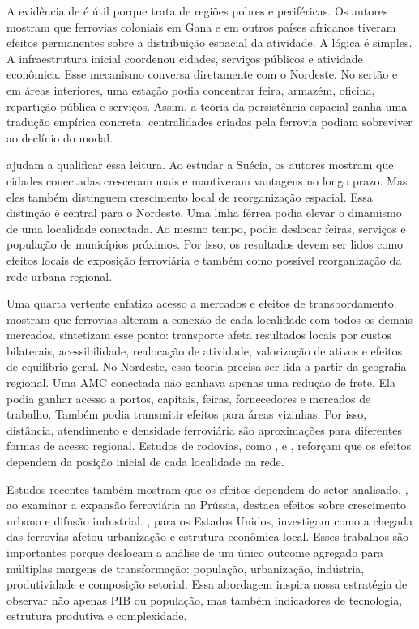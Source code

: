 \documentclass[12pt,a4paper]{article}
\begin{document}
A evidência de \citet{jedwab2016} é útil porque trata de regiões pobres e periféricas. Os autores mostram que ferrovias coloniais em Gana e em outros países africanos tiveram efeitos permanentes sobre a distribuição espacial da atividade. A lógica é simples. A infraestrutura inicial coordenou cidades, serviços públicos e atividade econômica. Esse mecanismo conversa diretamente com o Nordeste. No sertão e em áreas interiores, uma estação podia concentrar feira, armazém, oficina, repartição pública e serviços. Assim, a teoria da persistência espacial ganha uma tradução empírica concreta: centralidades criadas pela ferrovia podiam sobreviver ao declínio do modal.

\citet{berger2017} ajudam a qualificar essa leitura. Ao estudar a Suécia, os autores mostram que cidades conectadas cresceram mais e mantiveram vantagens no longo prazo. Mas eles também distinguem crescimento local de reorganização espacial. Essa distinção é central para o Nordeste. Uma linha férrea podia elevar o dinamismo de uma localidade conectada. Ao mesmo tempo, podia deslocar feiras, serviços e população de municípios próximos. Por isso, os resultados devem ser lidos como efeitos locais de exposição ferroviária e também como possível reorganização da rede urbana regional.

Uma quarta vertente enfatiza acesso a mercados e efeitos de transbordamento. \citet{donaldsonhornbeck2016} mostram que ferrovias alteram a conexão de cada localidade com todos os demais mercados. \citet{reddingturner2015} sintetizam esse ponto: transporte afeta resultados locais por custos bilaterais, acessibilidade, realocação de atividade, valorização de ativos e efeitos de equilíbrio geral. No Nordeste, essa teoria precisa ser lida a partir da geografia regional. Uma AMC conectada não ganhava apenas uma redução de frete. Ela podia ganhar acesso a portos, capitais, feiras, fornecedores e mercados de trabalho. Também podia transmitir efeitos para áreas vizinhas. Por isso, distância, atendimento e densidade ferroviária são aproximações para diferentes formas de acesso regional. Estudos de rodovias, como \citet{baumsnow2007}, \citet{durantonturner2012} e \citet{michaels2008}, reforçam que os efeitos dependem da posição inicial de cada localidade na rede.

Estudos recentes também mostram que os efeitos dependem do setor analisado. \citet{hornung2015}, ao examinar a expansão ferroviária na Prússia, destaca efeitos sobre crescimento urbano e difusão industrial. \citet{atack2010}, para os Estados Unidos, investigam como a chegada das ferrovias afetou urbanização e estrutura econômica local. Esses trabalhos são importantes porque deslocam a análise de um único outcome agregado para múltiplas margens de transformação: população, urbanização, indústria, produtividade e composição setorial. Essa abordagem inspira nossa estratégia de observar não apenas PIB ou população, mas também indicadores de tecnologia, estrutura produtiva e complexidade.
\end{document}
